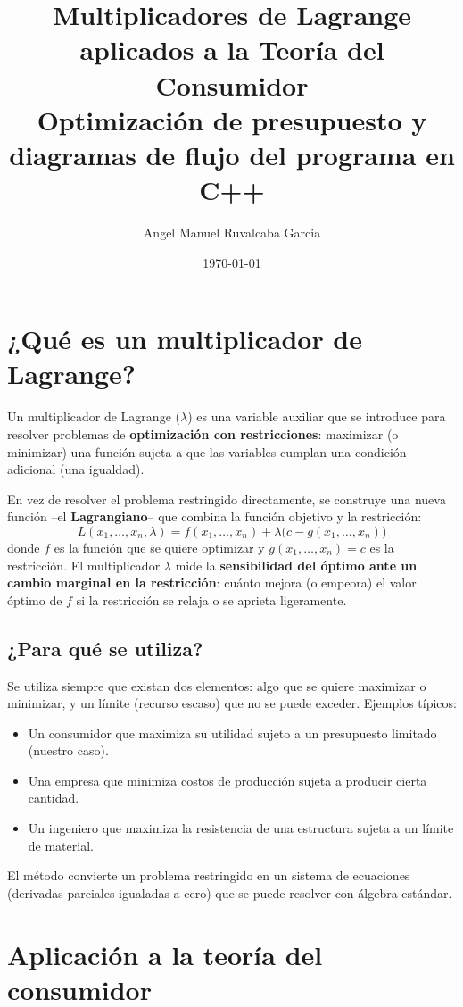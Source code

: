 \documentclass[12pt,letterpaper]{article}
\title{Multiplicadores de Lagrange aplicados a la Teoría del Consumidor\\
\large Optimización de presupuesto y diagramas de flujo del programa en C++}
\author{Angel Manuel Ruvalcaba Garcia}
\date{\today}
\begin{document}
\maketitle

\section{¿Qué es un multiplicador de Lagrange?}

Un multiplicador de Lagrange ($\lambda$) es una variable auxiliar que se introduce para resolver problemas de \textbf{optimización con restricciones}: maximizar (o minimizar) una función sujeta a que las variables cumplan una condición adicional (una igualdad).

En vez de resolver el problema restringido directamente, se construye una nueva función --el \textbf{Lagrangiano}-- que combina la función objetivo y la restricción:
\[
L(x_1,\dots,x_n,\lambda) = f(x_1,\dots,x_n) + \lambda \big(c - g(x_1,\dots,x_n)\big)
\]
donde $f$ es la función que se quiere optimizar y $g(x_1,\dots,x_n) = c$ es la restricción. El multiplicador $\lambda$ mide la \textbf{sensibilidad del óptimo ante un cambio marginal en la restricción}: cuánto mejora (o empeora) el valor óptimo de $f$ si la restricción se relaja o se aprieta ligeramente.

\subsection{¿Para qué se utiliza?}

Se utiliza siempre que existan dos elementos: algo que se quiere maximizar o minimizar, y un límite (recurso escaso) que no se puede exceder. Ejemplos típicos:
\begin{itemize}
    \item Un consumidor que maximiza su utilidad sujeto a un presupuesto limitado (nuestro caso).
    \item Una empresa que minimiza costos de producción sujeta a producir cierta cantidad.
    \item Un ingeniero que maximiza la resistencia de una estructura sujeta a un límite de material.
\end{itemize}

El método convierte un problema restringido en un sistema de ecuaciones (derivadas parciales igualadas a cero) que se puede resolver con álgebra estándar.

\section{Aplicación a la teoría del consumidor}
\end{document}
